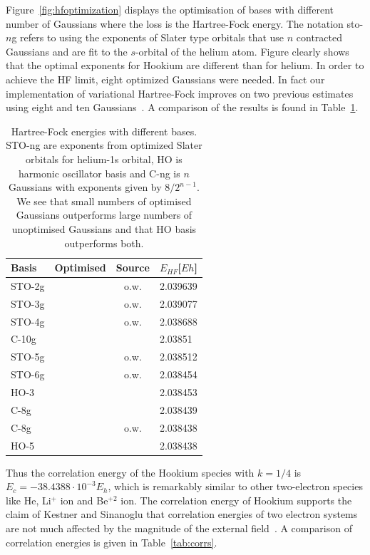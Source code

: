 \documentclass[final,3p,times,twocolumn]{elsarticle}
\newcommand{\cmark}{\ding{51}}%
\newcommand{\xmark}{\ding{55}}%
\begin{document}
	Figure~\ref{fig:hfoptimization} displays the optimisation of bases with different number of Gaussians where the loss is the Hartree-Fock energy. The notation sto-$n$g refers to using the exponents of Slater type orbitals that use $n$ contracted Gaussians and are fit to the $s$-orbital of the helium atom. Figure clearly shows that the optimal exponents for Hookium are different than for helium. In order to achieve the HF limit, eight optimized Gaussians were needed. In fact our implementation of variational Hartree-Fock improves on two previous estimates using eight and ten Gaussians~\cite{ONeill2003wave, amovilli2003exact}. A comparison of the results is found in Table~\ref{tab:HFenergies}.
	\begin{table}[h]
		\centering
		\begin{tabular}{@{}lccl@{}} 
			\toprule
			Basis & Optimised & Source & $E_{HF}$[$Eh$]\\ \midrule
			STO-2g & \cmark & o.w. & 2.039639 \\
			STO-3g & \cmark & o.w. & 2.039077 \\
			STO-4g & \cmark & o.w. & 2.038688 \\
			C-10g & \xmark & \cite{amovilli2003exact} & 2.03851 \\
			STO-5g & \cmark & o.w. & 2.038512 \\
			STO-6g & \cmark & o.w. & 2.038454 \\
			HO-3 & \xmark & \cite{ONeill2003wave} & 2.038453 \\ 
			C-8g & \xmark & \cite{ONeill2003wave} & 2.038439 \\
			C-8g & \cmark & o.w. & 2.038438 \\
			HO-5 & \xmark & \cite{ONeill2003wave} & 2.038438 \\ 
			\bottomrule
		\end{tabular}
		\caption{\label{tab:HFenergies}Hartree-Fock energies with different bases. STO-ng are exponents from optimized Slater orbitals for helium-1s orbital, HO is harmonic oscillator basis and C-ng is $n$ Gaussians with exponents given by $8 / 2^{n-1}$. We see that small numbers of optimised Gaussians outperforms large numbers of unoptimised Gaussians and that HO basis outperforms both.}
	\end{table}
	Thus the correlation energy of the Hookium species with $k=1/4$ is $E_c = -38.4388\cdot 10^{-3} E_h$, which is remarkably similar to other two-electron species like He, Li$^+$ ion and Be$^{+2}$ ion. The correlation energy of Hookium supports the claim of Kestner and Sinanoglu that correlation energies of two electron systems are not much affected by the magnitude of the external field~\cite{ONeill2003wave}. A comparison of correlation energies is given in Table~\ref{tab:corrs}.
\end{document}
